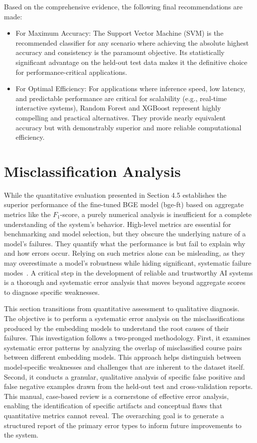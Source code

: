 Based on the comprehensive evidence, the following final recommendations are made:
\begin{itemize}
    \item For Maximum Accuracy: The Support Vector Machine (SVM) is the recommended classifier for any scenario where achieving the absolute highest accuracy and consistency is the paramount objective. Its statistically significant advantage on the held-out test data makes it the definitive choice for performance-critical applications.
    \item For Optimal Efficiency: For applications where inference speed, low latency, and predictable performance are critical for scalability (e.g., real-time interactive systems), Random Forest and XGBoost represent highly compelling and practical alternatives. They provide nearly equivalent accuracy but with demonstrably superior and more reliable computational efficiency.
\end{itemize}

\section{Misclassification Analysis}
While the quantitative evaluation presented in Section 4.5 establishes the superior performance of the fine-tuned BGE model (bge-ft) based on aggregate metrics like the \(F_1\)-score, a purely numerical analysis is insufficient for a complete understanding of the system's behavior. High-level metrics are essential for benchmarking and model selection, but they obscure the underlying nature of a model's failures. They quantify what the performance is but fail to explain why and how errors occur. Relying on such metrics alone can be misleading, as they may overestimate a model's robustness while hiding significant, systematic failure modes~\cite{gauthier2022}. A critical step in the development of reliable and trustworthy AI systems is a thorough and systematic error analysis that moves beyond aggregate scores to diagnose specific weaknesses.

This section transitions from quantitative assessment to qualitative diagnosis. The objective is to perform a systematic error analysis on the misclassifications produced by the embedding models to understand the root causes of their failures. This investigation follows a two-pronged methodology. First, it examines systematic error patterns by analyzing the overlap of misclassified course pairs between different embedding models. This approach helps distinguish between model-specific weaknesses and challenges that are inherent to the dataset itself. Second, it conducts a granular, qualitative analysis of specific false positive and false negative examples drawn from the held-out test and cross-validation reports. This manual, case-based review is a cornerstone of effective error analysis, enabling the identification of specific artifacts and conceptual flaws that quantitative metrics cannot reveal. The overarching goal is to generate a structured report of the primary error types to inform future improvements to the system.

